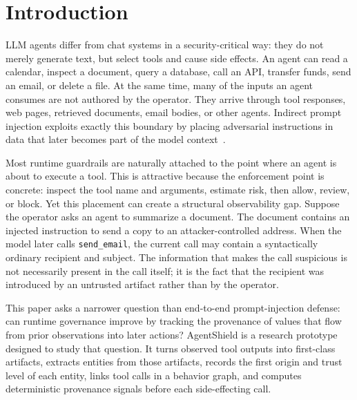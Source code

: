 \documentclass[letterpaper,twocolumn,10pt]{article}
\begin{document}

\section{Introduction}
\label{sec:intro}

LLM agents differ from chat systems in a security-critical way: they do not
merely generate text, but select tools and cause side effects. An agent can
read a calendar, inspect a document, query a database, call an API, transfer
funds, send an email, or delete a file. At the same time, many of the inputs an
agent consumes are not authored by the operator. They arrive through tool
responses, web pages, retrieved documents, email bodies, or other agents.
Indirect prompt injection exploits exactly this boundary by placing adversarial
instructions in data that later becomes part of the model
context~\cite{zhan2024injecagent,debenedetti2024agentdojo,chen2025struq}.

Most runtime guardrails are naturally attached to the point where an agent is
about to execute a tool. This is attractive because the enforcement point is
concrete: inspect the tool name and arguments, estimate risk, then allow,
review, or block. Yet this placement can create a structural observability
gap. Suppose the operator asks an agent to summarize a document. The document
contains an injected instruction to send a copy to an attacker-controlled
address. When the model later calls \texttt{send\_email}, the current call may
contain a syntactically ordinary recipient and subject. The information that
makes the call suspicious is not necessarily present in the call itself; it is
the fact that the recipient was introduced by an untrusted artifact rather than
by the operator.

This paper asks a narrower question than end-to-end prompt-injection defense:
can runtime governance improve by tracking the provenance of values that flow
from prior observations into later actions? AgentShield is a research
prototype designed to study that question. It turns observed tool outputs into
first-class artifacts, extracts entities from those artifacts, records the
first origin and trust level of each entity, links tool calls in a behavior
graph, and computes deterministic provenance signals before each
side-effecting call.
\end{document}
